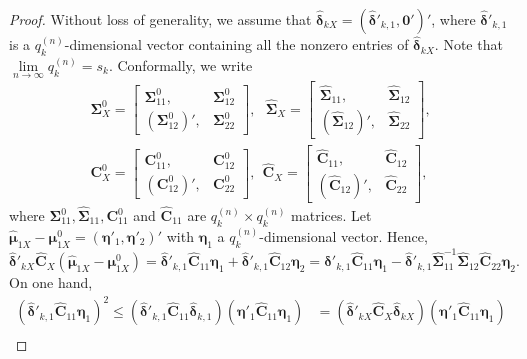 \documentclass[12pt]{article}
\begin{document}
\begin{proof}{}{}
Without loss of generality, we assume that $\hat{\bm \delta}_{kX} = (\hat{\bm \delta}'_{k,1}, \bm 0')'$, where $\hat{\bm \delta}'_{k,1}$ is a $q_k^{(n)}$-dimensional vector containing all the nonzero entries of $\hat{\bm \delta}_{kX}$.
Note that $\lim\limits_{n \rightarrow \infty} q_k^{(n)} = s_k$.
Conformally, we write
\begin{align*}
\bm \Sigma_X^0 = \left[
\begin{array}{cc}
\bm \Sigma^0_{11},      & \bm \Sigma^0_{12} \\
(\bm \Sigma^0_{12})',   & \bm \Sigma^0_{22}
\end{array}\right],~~~
\hat{\bm \Sigma}_X = \left[
\begin{array}{cc}
\hat{\bm \Sigma}_{11},      & \hat{\bm \Sigma}_{12} \\
(\hat{\bm \Sigma}_{12})',   & \hat{\bm \Sigma}_{22}
\end{array}\right], \\
\bm C_X^0 = \left[
\begin{array}{cc}
\bm C^0_{11},      & \bm C^0_{12} \\
(\bm C^0_{12})',   & \bm C^0_{22}
\end{array}\right],~~
\hat{\bm C}_X = \left[
\begin{array}{cc}
\hat{\bm C}_{11},      & \hat{\bm C}_{12} \\
(\hat{\bm C}_{12})',   & \hat{\bm C}_{22}
\end{array}\right],
\end{align*}
where $\bm \Sigma^0_{11}, \hat{\bm \Sigma}_{11}, \bm C^0_{11}$ and $\hat{\bm C}_{11}$ are $q_k^{(n)} \times q_k^{(n)}$ matrices.
Let $\hat{\bm \mu}_{1X} - \bm \mu_{1X}^0 = (\bm \eta'_1, \bm \eta'_2)'$ with $\bm \eta_1$ a $q_k^{(n)}$-dimensional vector.
Hence,
\begin{equation*}
\hat{\bm \delta}'_{kX} \hat{\bm C}_X (\hat{\bm \mu}_{1X} - \bm \mu_{1X}^0)
= \hat{\bm \delta}'_{k,1} \hat{\bm C}_{11} \bm \eta_1 + \hat{\bm \delta}'_{k,1} \hat{\bm C}_{12} \bm \eta_2
= \hat{\bm \delta}'_{k,1} \hat{\bm C}_{11} \bm \eta_1 - \hat{\bm \delta}'_{k,1} \hat{\bm \Sigma}_{11}^{-1} \hat{\bm \Sigma}_{12} \hat{\bm C}_{22} \bm \eta_2.
\end{equation*}
On one hand,
\begin{align*}
(\hat{\bm \delta}'_{k,1} \hat{\bm C}_{11} \bm \eta_1)^2 \leq (\hat{\bm \delta}'_{k,1} \hat{\bm C}_{11} \hat{\bm \delta}_{k,1})(\bm \eta'_1 \hat{\bm C}_{11} \bm \eta_1) &= (\hat{\bm \delta}'_{kX} \hat{\bm C}_X \hat{\bm \delta}_{kX})(\bm \eta'_1 \hat{\bm C}_{11} \bm \eta_1) \\

\end{align*}
\end{proof}
\end{document}

